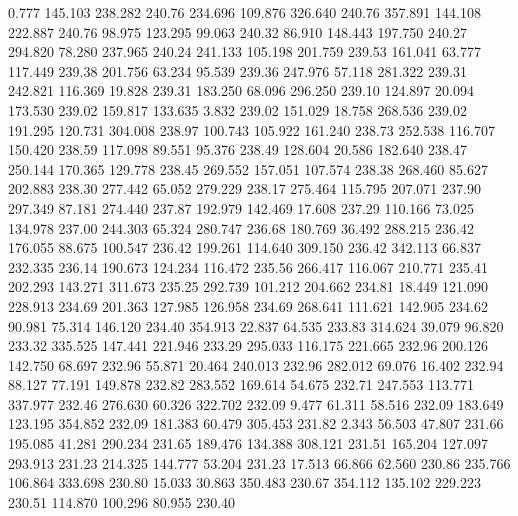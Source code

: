    0.777  145.103  238.282       240.76
 234.696  109.876  326.640       240.76
 357.891  144.108  222.887       240.76
  98.975  123.295   99.063       240.32
  86.910  148.443  197.750       240.27
 294.820   78.280  237.965       240.24
 241.133  105.198  201.759       239.53
 161.041   63.777  117.449       239.38
 201.756   63.234   95.539       239.36
 247.976   57.118  281.322       239.31
 242.821  116.369   19.828       239.31
 183.250   68.096  296.250       239.10
 124.897   20.094  173.530       239.02
 159.817  133.635    3.832       239.02
 151.029   18.758  268.536       239.02
 191.295  120.731  304.008       238.97
 100.743  105.922  161.240       238.73
 252.538  116.707  150.420       238.59
 117.098   89.551   95.376       238.49
 128.604   20.586  182.640       238.47
 250.144  170.365  129.778       238.45
 269.552  157.051  107.574       238.38
 268.460   85.627  202.883       238.30
 277.442   65.052  279.229       238.17
 275.464  115.795  207.071       237.90
 297.349   87.181  274.440       237.87
 192.979  142.469   17.608       237.29
 110.166   73.025  134.978       237.00
 244.303   65.324  280.747       236.68
 180.769   36.492  288.215       236.42
 176.055   88.675  100.547       236.42
 199.261  114.640  309.150       236.42
 342.113   66.837  232.335       236.14
 190.673  124.234  116.472       235.56
 266.417  116.067  210.771       235.41
 202.293  143.271  311.673       235.25
 292.739  101.212  204.662       234.81
  18.449  121.090  228.913       234.69
 201.363  127.985  126.958       234.69
 268.641  111.621  142.905       234.62
  90.981   75.314  146.120       234.40
 354.913   22.837   64.535       233.83
 314.624   39.079   96.820       233.32
 335.525  147.441  221.946       233.29
 295.033  116.175  221.665       232.96
 200.126  142.750   68.697       232.96
  55.871   20.464  240.013       232.96
 282.012   69.076   16.402       232.94
  88.127   77.191  149.878       232.82
 283.552  169.614   54.675       232.71
 247.553  113.771  337.977       232.46
 276.630   60.326  322.702       232.09
   9.477   61.311   58.516       232.09
 183.649  123.195  354.852       232.09
 181.383   60.479  305.453       231.82
   2.343   56.503   47.807       231.66
 195.085   41.281  290.234       231.65
 189.476  134.388  308.121       231.51
 165.204  127.097  293.913       231.23
 214.325  144.777   53.204       231.23
  17.513   66.866   62.560       230.86
 235.766  106.864  333.698       230.80
  15.033   30.863  350.483       230.67
 354.112  135.102  229.223       230.51
 114.870  100.296   80.955       230.40
